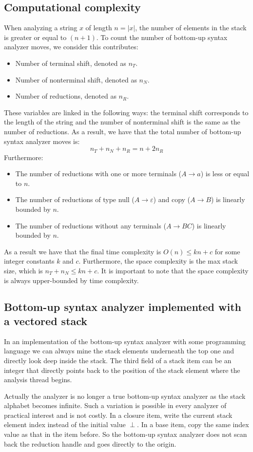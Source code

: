 \subsection*{Computational complexity}
When analyzing a string $x$ of length $n = \left\lvert x \right\rvert $, the number of elements in the stack is greater or equal to $(n + 1)$. 
To count the number of bottom-up syntax analyzer moves, we consider this contributes: 
\begin{itemize}
    \item Number of terminal shift, denoted as $n_T$. 
    \item Number of nonterminal shift, denoted as $n_N$. 
    \item Number of reductions, denoted as $n_R$. 
\end{itemize}
These variables are linked in the following ways: the terminal shift corresponds to the length of the string and the number of nonterminal shift is the same as the number of reductions. 
As a result, we have that the total number of bottom-up syntax analyzer moves is: 
\[n_T+n_N+n_R=n+2n_R\]
Furthermore: 
\begin{itemize}
    \item The number of reductions with one or more terminals ($A \rightarrow a$) is less or equal to $n$. 
    \item The number of reductions of type null ($A \rightarrow \varepsilon$) and copy ($A \rightarrow B$) is linearly bounded by $n$. 
    \item The number of reductions without any terminals ($A \rightarrow BC$) is linearly bounded by $n$.
\end{itemize}
As a result we have that the final time complexity is $O(n) \leq kn+c$ for some integer constants $k$ and $c$. 
Furthermore, the space complexity is the max stack size, which is $n_T+n_N \leq kn+c$. 
It is important to note that the space complexity is always upper-bounded by time complexity. 

\subsection*{Bottom-up syntax analyzer implemented with a vectored stack}
In an implementation of the bottom-up syntax analyzer with some programming language we can always mine the stack elements underneath the top one and directly look deep inside the stack. 
The third field of a stack item can be an integer that directly points back to the position of the stack element where the analysis thread begins. 

Actually the analyzer is no longer a true bottom-up syntax analyzer as the stack alphabet becomes infinite.
Such a variation is possible in every analyzer of practical interest and is not costly.
In a closure item, write the current stack element index instead of the initial value $\perp$.
In a base item, copy the same index value as that in the item before.
So the bottom-up syntax analyzer does not scan back the reduction handle and goes directly to the origin.